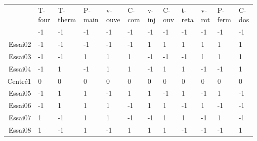 \bigskip

\bigskip

\makeatletter
\newcommand*{\yncellcolor}{}
\def\yncellcolor\ignorespaces{}
\newcolumntype{m}{>{\yncellcolor}c}
\makeatother

\begin{table}[hbtp]
	\centering
	\hspace*{-8mm}
	\begin{tabular}{m|m|m|m|m|m|m|m|m|m|m|m|}
		\arrayrulecolor{black}
		\hhline{~-----------}
		& T-four & T-therm & P-main & v-ouve & C-com & v-inj & C-ouv & t-reta & v-rot & P-ferm & C-dos \\ \hhline{-:=:=:=:=:=:=:=:=:=:=:=} %
		\multicolumn{1}{|r|}{Essai01} & -1     & -1      & -1     & -1     & -1    & -1    & -1    & -1     & -1    & -1     & -1    \\ \hline
		\multicolumn{1}{|r|}{Essai02} & -1     & -1      & -1     & -1     & -1    & 1     & 1     & 1      & 1     & 1      & 1     \\ \hline
		\multicolumn{1}{|r|}{Essai03} & -1     & -1      & 1      & 1      & 1     & -1    & -1    & -1     & 1     & 1      & 1     \\ \hline
		\multicolumn{1}{|r|}{Essai04} & -1     & 1       & -1     & 1      & 1     & -1    & 1     & 1      & -1    & -1     & 1     \\ \hline
		\multicolumn{1}{|r|}{Centré1} & 0      & 0       & 0      & 0      & 0     & 0     & 0     & 0      & 0     & 0      & 0     \\ \hline
		\multicolumn{1}{|r|}{Essai05} & -1     & 1       & 1      & -1     & 1     & 1     & -1    & 1      & -1    & 1      & -1    \\ \hline
		\multicolumn{1}{|r|}{Essai06} & -1     & 1       & 1      & 1      & -1    & 1     & 1     & -1     & 1     & -1     & -1    \\ \hline
		\multicolumn{1}{|r|}{Essai07} & 1      & -1      & 1      & 1      & -1    & -1    & 1     & 1      & -1    & 1      & -1    \\ \hline
		\multicolumn{1}{|r|}{Essai08} & 1      & -1      & 1      & -1     & 1     & 1     & 1     & -1     & -1    & -1     & 1     \\ \hline

\end{tabular}
\end{table}
